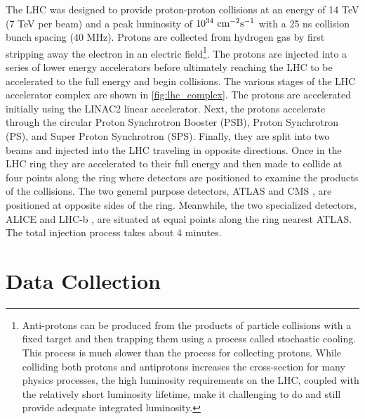 The LHC was designed to provide proton-proton collisions
at an energy of 14 TeV (7 TeV per beam) 
and a peak luminosity of $10^{34}~\textrm{cm}^{-2}\textrm{s}^{-1}$ with a 25 ns collision
bunch spacing (40 MHz).
Protons are collected from hydrogen gas by first stripping away 
the electron in an electric field\footnote{Anti-protons
can be produced  from the products of 
particle collisions with a fixed target and
then trapping them using a process called stochastic cooling. This process
is much slower than the process for collecting protons. While colliding both 
protons and antiprotons increases the cross-section
for many physics processes, the high luminosity requirements on the LHC,
coupled with the relatively short luminosity lifetime, make it challenging
to do and still provide adequate integrated luminosity.}.
The protons are injected
into a series of lower energy accelerators before ultimately 
reaching the LHC to be accelerated to the full energy and 
begin collisions. The various stages of the LHC accelerator
complex are shown in \fig\ref{fig:lhc_complex}.
The protons are accelerated initially using the LINAC2 linear
accelerator. Next, the protons accelerate through the circular
Proton Synchrotron Booster (PSB), Proton Synchrotron (PS),
and Super Proton Synchrotron (SPS). Finally, they 
are split into two beams and injected into the LHC
traveling in opposite directions. Once in the LHC
ring they are accelerated to their full energy and then made
to collide at four points along the ring where detectors
are positioned to examine the products of the collisions.
The two general purpose detectors, ATLAS \cite{ATLAS} and CMS \cite{CMS}, 
are positioned at opposite sides of the ring. 
Meanwhile, the two specialized detectors, ALICE \cite{ALICE} 
and LHC-b \cite{LHCB}, are situated at equal points along the ring
nearest ATLAS.
The total injection process takes about 4 minutes.




\section{Data Collection}


